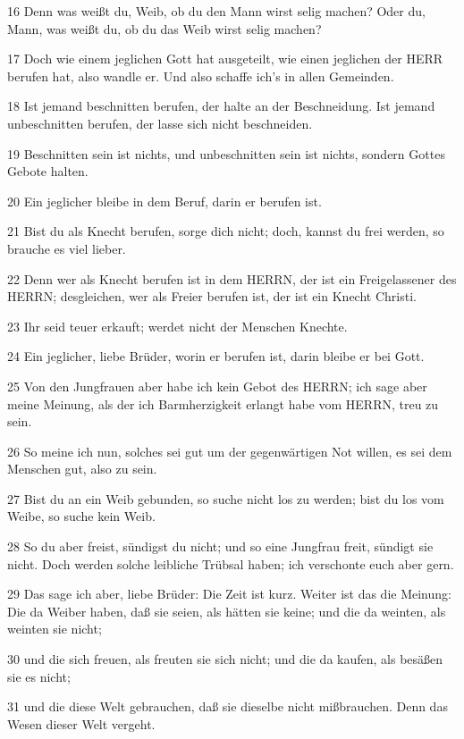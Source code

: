 \par 16 Denn was weißt du, Weib, ob du den Mann wirst selig machen? Oder du, Mann, was weißt du, ob du das Weib wirst selig machen?
\par 17 Doch wie einem jeglichen Gott hat ausgeteilt, wie einen jeglichen der HERR berufen hat, also wandle er. Und also schaffe ich's in allen Gemeinden.
\par 18 Ist jemand beschnitten berufen, der halte an der Beschneidung. Ist jemand unbeschnitten berufen, der lasse sich nicht beschneiden.
\par 19 Beschnitten sein ist nichts, und unbeschnitten sein ist nichts, sondern Gottes Gebote halten.
\par 20 Ein jeglicher bleibe in dem Beruf, darin er berufen ist.
\par 21 Bist du als Knecht berufen, sorge dich nicht; doch, kannst du frei werden, so brauche es viel lieber.
\par 22 Denn wer als Knecht berufen ist in dem HERRN, der ist ein Freigelassener des HERRN; desgleichen, wer als Freier berufen ist, der ist ein Knecht Christi.
\par 23 Ihr seid teuer erkauft; werdet nicht der Menschen Knechte.
\par 24 Ein jeglicher, liebe Brüder, worin er berufen ist, darin bleibe er bei Gott.
\par 25 Von den Jungfrauen aber habe ich kein Gebot des HERRN; ich sage aber meine Meinung, als der ich Barmherzigkeit erlangt habe vom HERRN, treu zu sein.
\par 26 So meine ich nun, solches sei gut um der gegenwärtigen Not willen, es sei dem Menschen gut, also zu sein.
\par 27 Bist du an ein Weib gebunden, so suche nicht los zu werden; bist du los vom Weibe, so suche kein Weib.
\par 28 So du aber freist, sündigst du nicht; und so eine Jungfrau freit, sündigt sie nicht. Doch werden solche leibliche Trübsal haben; ich verschonte euch aber gern.
\par 29 Das sage ich aber, liebe Brüder: Die Zeit ist kurz. Weiter ist das die Meinung: Die da Weiber haben, daß sie seien, als hätten sie keine; und die da weinten, als weinten sie nicht;
\par 30 und die sich freuen, als freuten sie sich nicht; und die da kaufen, als besäßen sie es nicht;
\par 31 und die diese Welt gebrauchen, daß sie dieselbe nicht mißbrauchen. Denn das Wesen dieser Welt vergeht.
